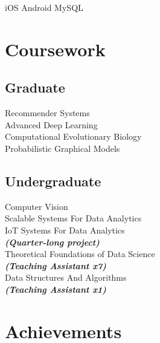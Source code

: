 \documentclass[]{deedy-resume-openfont}
\begin{document}
\begin{minipage}[t]{0.33\textwidth}
iOS \textbullet{} Android \textbullet{} MySQL
\sectionsep






\section{Coursework}
\subsection{Graduate}
Recommender Systems\\
Advanced Deep Learning\\
Computational Evolutionary Biology\\
Probabilistic Graphical Models\\
\sectionsep

\subsection{Undergraduate}
Computer Vision\\
Scalable Systems For Data Analytics\\
IoT Systems For Data Analytics\\
{\footnotesize \textit{\textbf{(Quarter-long project) }}} \\
Theoretical Foundations of Data Science\\
{\footnotesize \textit{\textbf{(Teaching Assistant x7) }}} \\
Data Structures And Algorithms\\
{\footnotesize \textit{\textbf{(Teaching Assistant x1) }}} \\

\sectionsep

\section{Achievements}

\end{minipage}
\end{document}
